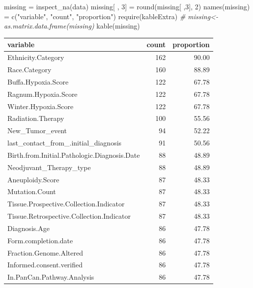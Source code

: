 \documentclass[
  11pt,
]{article}
\newenvironment{Shaded}{\begin{snugshade}}{\end{snugshade}}
\newcommand{\CommentTok}[1]{\textcolor[rgb]{0.56,0.35,0.01}{\textit{#1}}}
\newcommand{\DecValTok}[1]{\textcolor[rgb]{0.00,0.00,0.81}{#1}}
\newcommand{\FunctionTok}[1]{\textcolor[rgb]{0.00,0.00,0.00}{#1}}
\newcommand{\NormalTok}[1]{#1}
\newcommand{\OtherTok}[1]{\textcolor[rgb]{0.56,0.35,0.01}{#1}}
\newcommand{\StringTok}[1]{\textcolor[rgb]{0.31,0.60,0.02}{#1}}
\begin{document}
\begin{Shaded}
\begin{Highlighting}[]
\NormalTok{missing }\OtherTok{=} \FunctionTok{inspect\_na}\NormalTok{(data)}
\NormalTok{missing[ , }\DecValTok{3}\NormalTok{] }\OtherTok{=} \FunctionTok{round}\NormalTok{(missing[ ,}\DecValTok{3}\NormalTok{], }\DecValTok{2}\NormalTok{)}
\FunctionTok{names}\NormalTok{(missing) }\OtherTok{=} \FunctionTok{c}\NormalTok{(}\StringTok{"variable"}\NormalTok{, }\StringTok{"count"}\NormalTok{, }\StringTok{"proportion"}\NormalTok{)}
\FunctionTok{require}\NormalTok{(kableExtra)}
\CommentTok{\# missing\textless{}{-}as.matrix.data.frame(missing)}
\FunctionTok{kable}\NormalTok{(missing)}
\end{Highlighting}
\end{Shaded}

\begin{tabular}{l|r|r}
\hline
variable & count & proportion\\
\hline
Ethnicity.Category & 162 & 90.00\\
\hline
Race.Category & 160 & 88.89\\
\hline
Buffa.Hypoxia.Score & 122 & 67.78\\
\hline
Ragnum.Hypoxia.Score & 122 & 67.78\\
\hline
Winter.Hypoxia.Score & 122 & 67.78\\
\hline
Radiation.Therapy & 100 & 55.56\\
\hline
New\_Tumor\_event & 94 & 52.22\\
\hline
last\_contact\_from\_.initial\_diagnosis & 91 & 50.56\\
\hline
Birth.from.Initial.Pathologic.Diagnosis.Date & 88 & 48.89\\
\hline
Neodjuvant\_Therapy\_type & 88 & 48.89\\
\hline
Aneuploidy.Score & 87 & 48.33\\
\hline
Mutation.Count & 87 & 48.33\\
\hline
Tissue.Prospective.Collection.Indicator & 87 & 48.33\\
\hline
Tissue.Retrospective.Collection.Indicator & 87 & 48.33\\
\hline
Diagnosis.Age & 86 & 47.78\\
\hline
Form.completion.date & 86 & 47.78\\
\hline
Fraction.Genome.Altered & 86 & 47.78\\
\hline
Informed.consent.verified & 86 & 47.78\\
\hline
In.PanCan.Pathway.Analysis & 86 & 47.78\\

\end{tabular}
\end{document}
